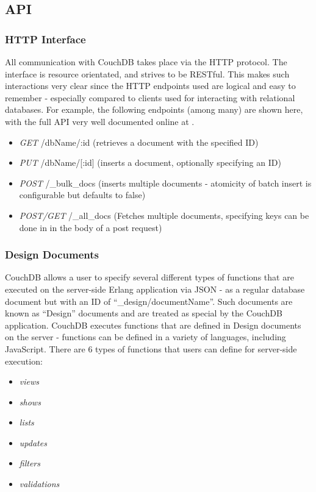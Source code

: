 \subsection{API}
\subsubsection{HTTP Interface}
All communication with CouchDB takes place via the HTTP protocol. The interface is resource orientated, and strives to be RESTful. This makes such interactions very clear since the HTTP endpoints used are logical and easy to remember - especially compared to clients used for interacting with relational databases. For example, the following endpoints (among many) are shown here, with the full API very well documented online at \cite{couch-api}.

\begin{itemize}
    \item \textit{GET} /dbName/:id (retrieves a document with the specified ID)
    \item \textit{PUT} /dbName/[:id] (inserts a document, optionally specifying an ID)
    \item \textit{POST} /\_bulk\_docs (inserts multiple documents - atomicity of batch insert is configurable but defaults to false)
    \item \textit{POST/GET} /\_all\_docs (Fetches multiple documents, specifying keys can be done in in the body of a post request)
\end{itemize}

\subsubsection{Design Documents}
CouchDB allows a user to specify several different types of functions that are executed on the server-side Erlang application via JSON - as a regular database document but with an ID of ``\_design/documentName''. Such documents are known as ``Design'' documents and are treated as special by the CouchDB application. CouchDB executes functions that are defined in Design documents on the server - functions can be defined in a variety of languages, including JavaScript. There are 6 types of functions that users can define for server-side execution:

\begin{itemize}
    \item \textit{views}
    \item \textit{shows}
    \item \textit{lists}
    \item \textit{updates}
    \item \textit{filters}
    \item \textit{validations}
\end{itemize}


